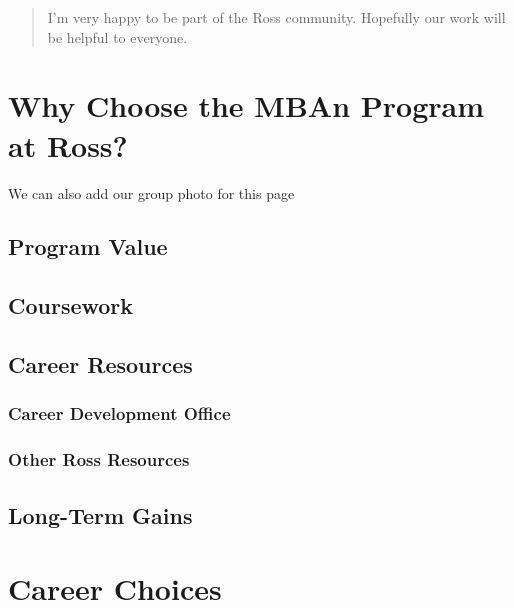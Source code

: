 \documentclass[
]{book}
\begin{document}
\begin{quote}
I'm very happy to be part of the Ross community. Hopefully our work will be helpful to everyone.
\end{quote}

\hypertarget{why-choose-the-mban-program-at-ross}{%
\chapter{Why Choose the MBAn Program at Ross?}\label{why-choose-the-mban-program-at-ross}}

We can also add our group photo for this page

\hypertarget{program-value}{%
\section{Program Value}\label{program-value}}

\hypertarget{coursework}{%
\section{Coursework}\label{coursework}}

\hypertarget{career-resources}{%
\section{Career Resources}\label{career-resources}}

\hypertarget{career-development-office}{%
\subsection{Career Development Office}\label{career-development-office}}

\hypertarget{other-ross-resources}{%
\subsection{Other Ross Resources}\label{other-ross-resources}}

\hypertarget{long-term-gains}{%
\section{Long-Term Gains}\label{long-term-gains}}

\hypertarget{career-choices}{%
\chapter{Career Choices}\label{career-choices}}
\end{document}
